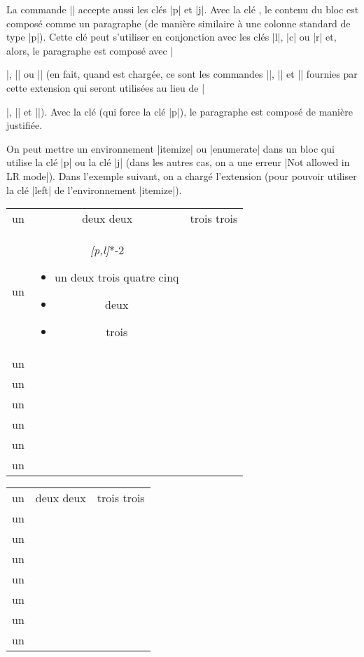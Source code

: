\documentclass[dvipsnames]{article}%
\begin{document}
\bigskip

La commande |\Block| accepte aussi les clés |p| et |j|. Avec la clé
, le contenu du bloc est composé comme un paragraphe (de manière
similaire à une colonne standard de type |p|). Cette clé peut s'utiliser en
conjonction avec les clés |l|, |c| ou |r| et, alors, le paragraphe est composé
avec |\raggedright|, |\centering| ou |\raggedleft| (en fait, quand
 est chargée, ce sont les commandes
|\RaggedRight|, |\Centering| et |\RaggedLeft| fournies par cette extension qui
seront utilisées au lieu de |\raggedright|, |\centering| et |\raggedleft|).
Avec la clé  (qui force la clé |p|), le paragraphe est composé de
manière justifiée. 

\bigskip
On peut mettre un environnement |{itemize}| ou |{enumerate}| dans un bloc qui
utilise la clé |p| ou la clé |j| (dans les autres cas, on a une erreur 
|Not allowed in LR mode|). Dans l'exemple suivant, on a chargé l'extension
 (pour pouvoir utiliser la clé |left| de l'environnement
|{itemize}|).

\medskip
\begin{Code}
\begin{NiceTabular}[hvlines]{ccc}
un & deux deux & trois trois \\
un & 
\Block\emph{[p,l]}{*-2}{%
\begin{itemize}[left=0pt]
\item un deux trois quatre cinq 
\item deux 
\item trois
\end{itemize}%
} \\
un & \\
un & \\
un & \\
un & \\
un & \\
un & \\
\end{NiceTabular}
\end{Code}


\begin{center}
\begin{NiceTabular}[hvlines]{ccc}
un & deux deux & trois trois \\
un & 
 \\
un & \\
un & \\
un & \\
un & \\
un & \\
un & \\
\end{NiceTabular}
\end{center}
\end{document}
